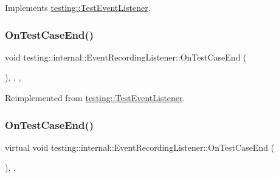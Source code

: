 Implements \mbox{\hyperlink{classtesting_1_1_test_event_listener_a468b5e6701bcb86cb2c956caadbba5e4}{testing\+::\+Test\+Event\+Listener}}.

\mbox{\label{classtesting_1_1internal_1_1_event_recording_listener_a52788314427f5c7a4585ea0bf5f3c251}} 
\subsubsection{\texorpdfstring{OnTestCaseEnd()}{OnTestCaseEnd()}\hspace{0.1cm}{\footnotesize\ttfamily [1/3]}}
{\footnotesize\ttfamily void testing\+::internal\+::\+Event\+Recording\+Listener\+::\+On\+Test\+Case\+End (\begin{DoxyParamCaption}\item[{const \mbox{\hyperlink{classtesting_1_1_test_case}{Test\+Case}} \&}]{ }\end{DoxyParamCaption})\hspace{0.3cm}{\ttfamily [inline]}, {\ttfamily [override]}, {\ttfamily [protected]}, {\ttfamily [virtual]}}



Reimplemented from \mbox{\hyperlink{classtesting_1_1_test_event_listener_a6cada1572dde8010b94f6dd237ce52f4}{testing\+::\+Test\+Event\+Listener}}.

\mbox{\label{classtesting_1_1internal_1_1_event_recording_listener_a4d0cb8a389c7339bce0aa6128291529f}} 
\subsubsection{\texorpdfstring{OnTestCaseEnd()}{OnTestCaseEnd()}\hspace{0.1cm}{\footnotesize\ttfamily [2/3]}}
{\footnotesize\ttfamily virtual void testing\+::internal\+::\+Event\+Recording\+Listener\+::\+On\+Test\+Case\+End (\begin{DoxyParamCaption}\item[{const \mbox{\hyperlink{classtesting_1_1_test_case}{Test\+Case}} \&}]{ }\end{DoxyParamCaption})\hspace{0.3cm}{\ttfamily [inline]}, {\ttfamily [protected]}, {\ttfamily [virtual]}}



